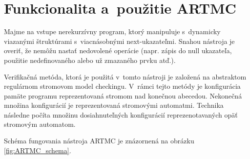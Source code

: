 \section{Funkcionalita a~použitie ARTMC}
Majme na vstupe nerekurzívny program, ktorý manipuluje s~dynamicky viazanými
štruktúrami s~viacnásobnými next-ukazateľmi. Snahou nástroja je overiť, že
nemôžu nastať nedovolené operácie (napr. zápis do null ukazateľa, použitie
nedefinovaného alebo už zmazaného prvku atď.)\cite{artmc1}.

Verifikačná metóda, ktorá je použitá v~tomto nástroji je založená na abstraktom
regulárnom stromovom model checkingu. V~rámci tejto metódy je konfigurácia pamäte programu reprezentovaná stromom nad konečnou abecedou. Nekonečná množina konfigurácií je reprezentovaná stromovými automatmi. Technika následne počíta množinu dosiahnuteľných konfigurácií reprezenotavaných opäť stromovým automatom\cite{artmc2}.

Schéma fungovania nástroja ARTMC je znázornená na obrázku \ref{fig:ARTMC_schema}.


